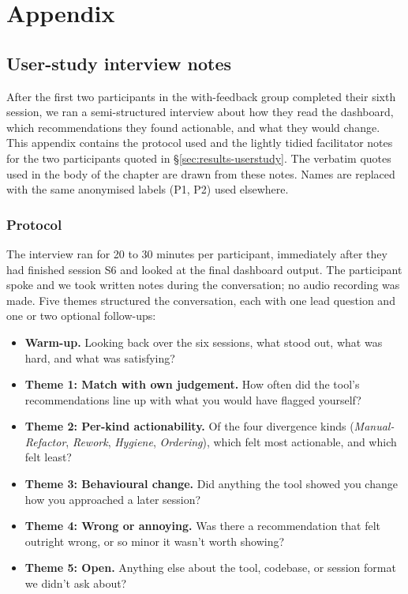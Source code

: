 \appendix

\chapter{Appendix}
\label{ch:appendix}

\section{User-study interview notes}
\label{app:interviews}

After the first two participants in the with-feedback group completed their sixth session, we ran a semi-structured interview about how they read the dashboard, which recommendations they found actionable, and what they would change. This appendix contains the protocol used and the lightly tidied facilitator notes for the two participants quoted in \S\ref{sec:results-userstudy}. The verbatim quotes used in the body of the chapter are drawn from these notes. Names are replaced with the same anonymised labels (P1, P2) used elsewhere.

\subsection{Protocol}

The interview ran for 20 to 30 minutes per participant, immediately after they had finished session S6 and looked at the final dashboard output. The participant spoke and we took written notes during the conversation; no audio recording was made. Five themes structured the conversation, each with one lead question and one or two optional follow-ups:

\begin{itemize}
  \item \textbf{Warm-up.} Looking back over the six sessions, what stood out, what was hard, and what was satisfying?
  \item \textbf{Theme 1: Match with own judgement.} How often did the tool's recommendations line up with what you would have flagged yourself?
  \item \textbf{Theme 2: Per-kind actionability.} Of the four divergence kinds (\emph{Manual-Refactor}, \emph{Rework}, \emph{Hygiene}, \emph{Ordering}), which felt most actionable, and which felt least?
  \item \textbf{Theme 3: Behavioural change.} Did anything the tool showed you change how you approached a later session?
  \item \textbf{Theme 4: Wrong or annoying.} Was there a recommendation that felt outright wrong, or so minor it wasn't worth showing?
  \item \textbf{Theme 5: Open.} Anything else about the tool, codebase, or session format we didn't ask about?
\end{itemize}


